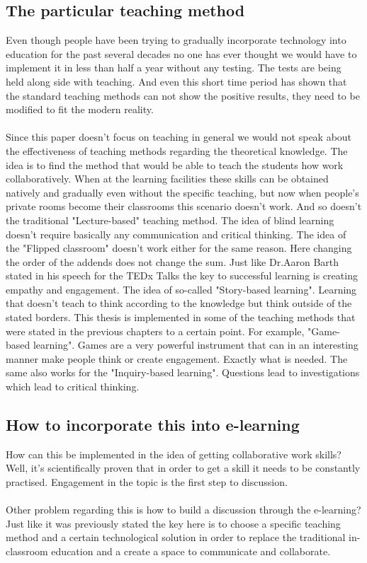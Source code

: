 \documentclass[10pt,oneside,english,a4paper]{article}
\begin{document}
\subsection{The particular teaching method}
Even though people have been trying to gradually incorporate technology into education for the past several decades no one has ever thought we would have to implement it in less than half a year without any testing. The tests are being held along side with teaching. And even this short time period has shown that the standard teaching methods can not show the positive results, they need to be modified to fit the modern reality. \paragraph{}
Since this paper doesn't focus on teaching in general we would not speak about the effectiveness of teaching methods regarding the theoretical knowledge. The idea is to find the method that would be able to teach the students how work collaboratively. When at the learning facilities these skills can be obtained natively and gradually even without the specific teaching, but now when people's private rooms become their classrooms this scenario doesn't work. And so doesn't the traditional "Lecture-based" teaching method. The idea of blind learning doesn't require basically any communication and critical thinking. The idea of the "Flipped classroom" doesn't work either for the same reason. Here changing the order of the addends does not change the sum. Just like Dr.Aaron Barth stated in his speech for the TEDx Talks the key to successful  learning is creating empathy and engagement. The idea of so-called "Story-based learning".\cite{barth_2020} Learning that doesn't teach to think according to the knowledge but think outside of the stated borders. This thesis is implemented in some of the teaching methods that were stated in the previous chapters to a certain point. For example, "Game-based learning". Games are a very powerful instrument that can in an interesting manner make people think or create engagement. Exactly what is needed. The same also works for the "Inquiry-based learning". Questions lead to investigations which lead to critical thinking. 
 
\subsection{How to incorporate this into e-learning}
How can this be implemented in the idea of getting collaborative work skills? Well, it's scientifically proven that in order to get a skill it needs to be constantly practised. Engagement in the topic is the first step to discussion.  \paragraph{}
Other problem regarding this is how to build a discussion through the e-learning? Just like it was previously stated the key here is to choose a specific teaching method and a certain technological solution in order to replace the traditional in-classroom education and a create a space to communicate and collaborate.
\end{document}
